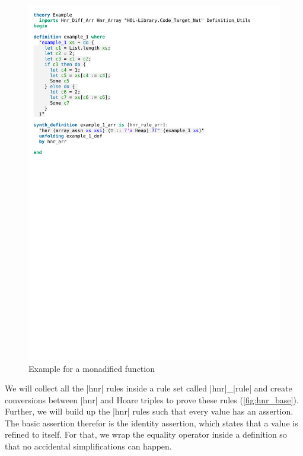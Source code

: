 \begin{figure}[htpb]
    \includegraphics[trim={0 20,2cm 0 2,4cm}, clip, width=1.00\textwidth]{figures/Theory_Example.pdf}
    \caption[Example for a monadified function]{Example for a monadified function}
    \label{fig:monadified_example}
\end{figure}

\noindent We will collect all the |hnr| rules inside a rule set called |hnr|\_|rule| and create conversions between |hnr| and Hoare triples to prove these rules (\autoref{fig:hnr_base}).\\
Further, we will build up the |hnr| rules such that every value has an assertion. The basic assertion therefor is the identity assertion, which states that a value is refined to itself. For that, we wrap the equality operator inside a definition so that no accidental simplifications can happen.

